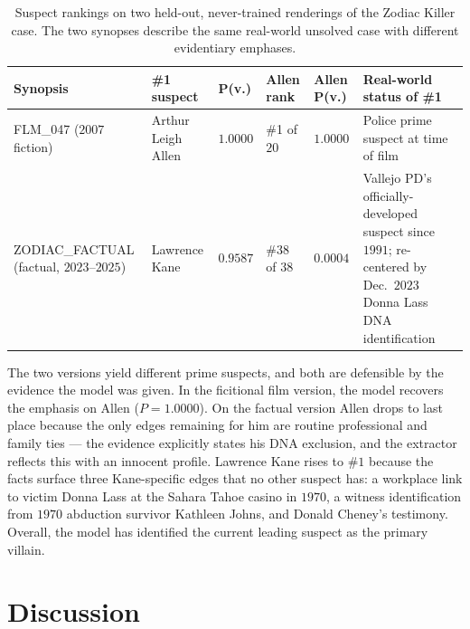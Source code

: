 \documentclass[11pt]{article}
\begin{document}
\begin{table}[h]
\centering
\footnotesize
\caption{Suspect rankings on two held-out, never-trained renderings of the Zodiac Killer case. The two synopses describe the same real-world unsolved case with different evidentiary emphases.}
\label{tab:zodiac}
\begin{tabular}{>{\raggedright\arraybackslash}p{3.0cm}>{\raggedright\arraybackslash}p{2.4cm}>{\raggedright\arraybackslash}p{1.0cm}>{\raggedright\arraybackslash}p{1.5cm}>{\raggedright\arraybackslash}p{1.2cm}>{\raggedright\arraybackslash}p{4.2cm}}
\toprule
\textbf{Synopsis} & \textbf{\#1 suspect} & \textbf{P(v.)} & \textbf{Allen rank} & \textbf{Allen P(v.)} & \textbf{Real-world status of \#1} \\
\midrule
FLM\_047 ($2007$ fiction) & Arthur Leigh Allen & $1.0000$ & \#1 of $20$ & $1.0000$ & Police prime suspect at time of film \\
ZODIAC\_FACTUAL (factual, $2023$--$2025$) & Lawrence Kane & $0.9587$ & \#$38$ of $38$ & $0.0004$ & Vallejo PD's officially-developed suspect since $1991$; re-centered by Dec.~$2023$ Donna Lass DNA identification \\
\bottomrule
\end{tabular}
\end{table}

The two versions yield different prime suspects, and both are defensible by the evidence the model was given. In the ficitional film version, the model recovers the emphasis on Allen ($P=1.0000$). On the factual version Allen drops to last place because the only edges remaining for him are routine professional and family ties --- the evidence explicitly states his DNA exclusion, and the extractor reflects this with an innocent profile. Lawrence Kane rises to \#$1$ because the facts surface three Kane-specific edges that no other suspect has: a workplace link to victim Donna Lass at the Sahara Tahoe casino in $1970$, a witness identification from $1970$ abduction survivor Kathleen Johns, and Donald Cheney's testimony. Overall, the model has identified the current leading suspect as the primary villain.

\section{Discussion}
\label{sec:discussion}
\end{document}
